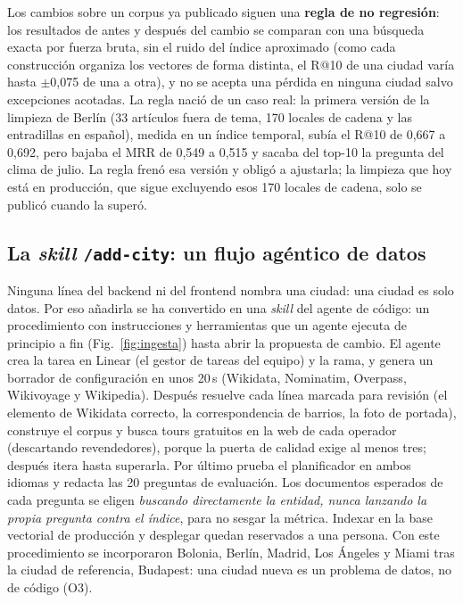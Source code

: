 Los cambios sobre un corpus ya publicado siguen una \textbf{regla de no regresión}: los resultados
de antes y después del cambio se comparan con una búsqueda exacta por fuerza bruta, sin el ruido
del índice aproximado (como cada construcción organiza los vectores de forma distinta, el R@10 de
una ciudad varía hasta $\pm$0,075 de una a otra), y no se acepta una pérdida en ninguna ciudad
salvo excepciones acotadas. La regla nació de un caso real: la primera versión de la limpieza de
Berlín (33 artículos fuera de tema, 170 locales de cadena y las entradillas en español), medida en
un índice temporal, subía el R@10 de 0,667 a 0,692, pero bajaba el MRR de 0,549 a 0,515 y sacaba
del top-10 la pregunta del clima de julio. La regla frenó esa versión y obligó a ajustarla; la
limpieza que hoy está en producción, que sigue excluyendo esos 170 locales de cadena, solo se
publicó cuando la superó.

\subsection{La \emph{skill} \texttt{/add-city}: un flujo agéntico de datos}\label{sec:addcity}

Ninguna línea del backend ni del frontend nombra una ciudad: una ciudad es solo datos. Por eso
añadirla se ha convertido en una \emph{skill} del agente de código: un procedimiento con instrucciones y
herramientas que un agente ejecuta de principio a fin (Fig.~\ref{fig:ingesta}) hasta abrir la
propuesta de cambio. El agente crea la tarea en Linear (el gestor de tareas del equipo) y la rama,
y genera un borrador de configuración en unos 20\,s (Wikidata, Nominatim, Overpass, Wikivoyage y
Wikipedia). Después resuelve cada línea marcada para revisión (el elemento de Wikidata correcto, la
correspondencia de barrios, la foto de portada), construye el corpus y busca tours gratuitos en la
web de cada operador (descartando revendedores), porque la puerta de calidad exige al menos tres;
después itera hasta superarla. Por último prueba el planificador en ambos idiomas y redacta las 20
preguntas de evaluación. Los documentos esperados de cada pregunta se eligen \emph{buscando
directamente la entidad, nunca lanzando la propia pregunta contra el índice}, para no sesgar la
métrica. Indexar en la base vectorial de producción y desplegar quedan reservados a una persona.
Con este procedimiento se incorporaron Bolonia, Berlín, Madrid, Los Ángeles y Miami tras la ciudad
de referencia, Budapest: una ciudad nueva es un problema de datos, no de código (O3).

